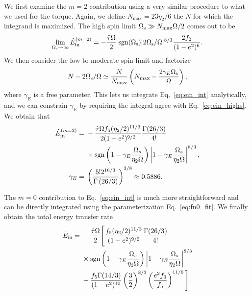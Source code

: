 \documentclass[
        fleqn,
        usenatbib,
    ]{mnras}
\newcommand*{\p}[1]{\left(#1\right)}
\begin{document}
We first examine the $m = 2$ contribution using a very similar procedure to what
we used for the torque. Again, we define $N_{\max} = 23\eta_2 / 6$ the $N$ for
which the integrand is maximized. The high spin limit $\Omega_{\rm s} \gg
N_{\max}\Omega / 2$ comes out to be
\begin{equation}
    \lim_{\Omega_{\rm s} \to \infty} \dot{E}_{\rm in}^{(m=2)} =
        -\frac{\hat{\tau}\Omega}{2} \; \mathrm{sgn}(\Omega_{\rm s})|2\Omega_{\rm
        s}/\Omega|^{8/3} \frac{2f_2}{(1 - e^2)^6}.\label{eq:ein_highs}
\end{equation}
We then consider the low-to-moderate spin limit and factorize
\begin{equation}
    N - 2\Omega_{\rm s} / \Omega \simeq \frac{N}{N_{\max}}
        \left(N_{\max} - \frac{2\gamma_E
        \Omega_{\rm s}}{\Omega}\right)\label{eq:nmax_ansatz},
\end{equation}
where $\gamma_E$ is a free parameter. This lets us integrate
Eq.~\eqref{eq:ein_int} analytically, and we can constrain $\gamma_E$ by
requiring the integral agree with Eq.~\eqref{eq:ein_highs}. We obtain that
\begin{align}
    \dot{E}_{\rm in}^{(m=2)}
        ={}& -\frac{\hat{\tau}\Omega f_5 (\eta_2/2)^{11/3}}{2(1-e^2)^{9/2}}
            \frac{\Gamma(26/3)}{4!}\nonumber\\
        &\times \mathrm{sgn}\p{1 - \gamma_E\frac{\Omega_s}{\eta_2 \Omega}}
            \left|1 - \gamma_E\frac{\Omega_s}{\eta_2 \Omega}\right|^{8/3},\\
    \gamma_E ={}& \p{\frac{5! 2^{16/3}}{\Gamma\p{26/3}}}^{3/8}
        \approx 0.5886.
\end{align}

The $m = 0$ contribution to Eq.~\eqref{eq:ein_int} is much more straightforward
and can be directly integrated using the parameterization
Eq.~\eqref{eq:fn0_fit}. We finally obtain the total energy transfer rate
\begin{align}
    \dot{E}_{\rm in} ={}& -\frac{\hat{\tau} \Omega}{2}\Bigg[\frac{f_5
        (\eta_2/2)^{11/3}}{(1-e^2)^{9/2}} \frac{\Gamma(26/3)}{4!}\nonumber\\
        &\times \mathrm{sgn}\p{1 - \gamma_E\frac{\Omega_s}{\eta_2 \Omega}}
            \left|1 - \gamma_E\frac{\Omega_s}{\eta_2 \Omega}\right|^{8/3}
            \nonumber\\
        &+
    \frac{f_5 \Gamma(14 / 3)}{(1 - e^2)^{10}} \left(\frac{3}{2}\right)^{8/3}
            \left(\frac{e^2 f_3}{f_5}\right)^{11/6}\Bigg].
            \label{eq:total_heating}
\end{align}
\end{document}
